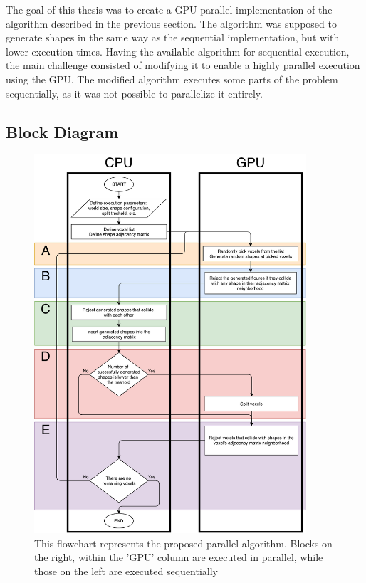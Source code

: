 \documentclass[12pt, oneside]{report}
\begin{document}
The goal of this thesis was to create a GPU-parallel implementation of the algorithm described in the previous section. The algorithm was supposed to generate shapes in the same way as the sequential implementation, but with lower execution times. \newline
Having the available algorithm for sequential execution, the main challenge consisted of modifying it to enable a highly parallel execution using the GPU. The modified algorithm executes some parts of the problem sequentially, as it was not possible to parallelize it entirely.

\subsection{Block Diagram}

\begin{figure}[H]
  \centering
	\includegraphics[width=0.9\textwidth,height=0.9\textheight,keepaspectratio]{Images/GPURSA/GPUDiagram1.pdf}
	\caption{This flowchart represents the proposed parallel algorithm. \newline
		Blocks on the right, within the 'GPU' column are executed in parallel, while those on the left are executed sequentially}
	\label{GPURSABlockDiagramPdf}
\end{figure}
\end{document}
